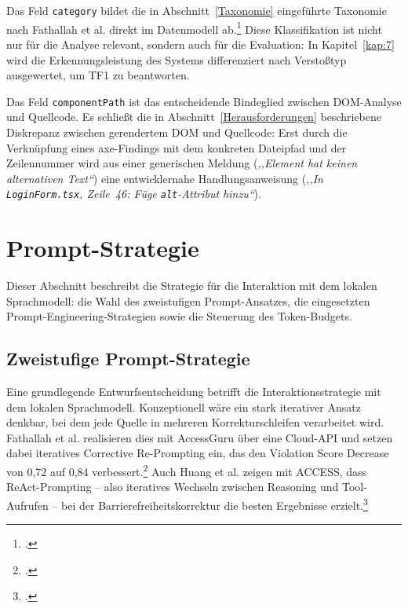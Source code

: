 Das Feld \texttt{category} bildet die in Abschnitt~\ref{Taxonomie} eingeführte Taxonomie nach Fathallah et al. direkt im Datenmodell ab.\footcite[Vgl.][]{fathallah_accessguru_2025} Diese Klassifikation ist nicht nur für die Analyse relevant, sondern auch für die Evaluation: In Kapitel~\ref{kap:7} wird die Erkennungsleistung des Systems differenziert nach Verstoßtyp ausgewertet, um \ac{TF}1 zu beantworten.

Das Feld \texttt{componentPath} ist das entscheidende Bindeglied zwischen \ac{DOM}-Analyse und Quellcode. Es schließt die in Abschnitt~\ref{Herausforderungen} beschriebene Diskrepanz zwischen gerendertem \ac{DOM} und Quellcode: Erst durch die Verknüpfung eines axe-Findings mit dem konkreten Dateipfad und der Zeilennummer wird aus einer generischen Meldung (\emph{,,Element hat keinen alternativen Text``}) eine entwicklernahe Handlungsanweisung (\emph{,,In \texttt{LoginForm.tsx}, Zeile~46: Füge \texttt{alt}-Attribut hinzu``}).

\section{Prompt-Strategie}
\label{sec:kontextualisierung}

Dieser Abschnitt beschreibt die Strategie für die Interaktion mit dem lokalen Sprachmodell: die Wahl des zweistufigen Prompt-Ansatzes, die eingesetzten Prompt-Engineering-Strategien sowie die Steuerung des Token-Budgets.

\subsection{Zweistufige Prompt-Strategie}

Eine grundlegende Entwurfsentscheidung betrifft die Interaktionsstrategie mit dem lokalen Sprachmodell. Konzeptionell wäre ein stark iterativer Ansatz denkbar, bei dem jede Quelle in mehreren Korrekturschleifen verarbeitet wird. Fathallah et al. realisieren dies mit AccessGuru über eine Cloud-API und setzen dabei iteratives Corrective Re-Prompting ein, das den Violation Score Decrease von 0,72 auf 0,84 verbessert.\footcite[Vgl.][]{fathallah_accessguru_2025} Auch Huang et al. zeigen mit ACCESS, dass ReAct-Prompting -- also iteratives Wechseln zwischen Reasoning und Tool-Aufrufen -- bei der Barrierefreiheitskorrektur die besten Ergebnisse erzielt.\footcite[Vgl.][S.~5]{huang_access_2024}

